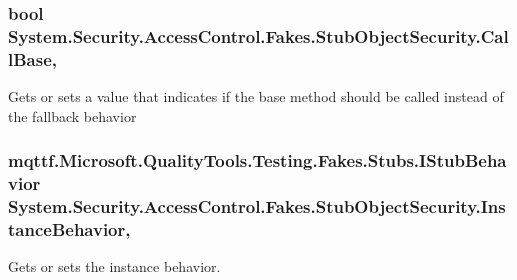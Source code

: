 \hypertarget{class_system_1_1_security_1_1_access_control_1_1_fakes_1_1_stub_object_security_ab37e9d2e3bb4a8292cd6fe10bdce8b73}{
\subsubsection[{Call\-Base}]{\setlength{\rightskip}{0pt plus 5cm}bool System.\-Security.\-Access\-Control.\-Fakes.\-Stub\-Object\-Security.\-Call\-Base\hspace{0.3cm}{\ttfamily [get]}, {\ttfamily [set]}}}\label{class_system_1_1_security_1_1_access_control_1_1_fakes_1_1_stub_object_security_ab37e9d2e3bb4a8292cd6fe10bdce8b73}


Gets or sets a value that indicates if the base method should be called instead of the fallback behavior

\hypertarget{class_system_1_1_security_1_1_access_control_1_1_fakes_1_1_stub_object_security_a9fff2332a718cb1b57a77d31f14a146c}{
\subsubsection[{Instance\-Behavior}]{\setlength{\rightskip}{0pt plus 5cm}mqttf.\-Microsoft.\-Quality\-Tools.\-Testing.\-Fakes.\-Stubs.\-I\-Stub\-Behavior System.\-Security.\-Access\-Control.\-Fakes.\-Stub\-Object\-Security.\-Instance\-Behavior\hspace{0.3cm}{\ttfamily [get]}, {\ttfamily [set]}}}\label{class_system_1_1_security_1_1_access_control_1_1_fakes_1_1_stub_object_security_a9fff2332a718cb1b57a77d31f14a146c}


Gets or sets the instance behavior.

